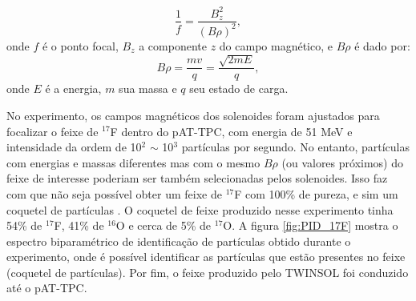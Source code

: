\documentclass[a4paper,12pt,oneside]{book}
\begin{document}
\begin{equation}
    \frac{1}{f} = \frac{B_z ^2}{(B\rho)^2},
\end{equation}
%
onde $f$ é o ponto focal, $B_z$ a componente $z$ do campo magnético, e $B\rho$ é dado por:
%
\begin{equation}
    B\rho = \frac{mv}{q} = \frac{\sqrt{2mE}}{q},
\end{equation}
%
onde $E$ é a energia, $m$ sua massa e $q$ seu estado de carga.


\par No experimento, os campos magnéticos dos solenoides foram ajustados para focalizar o feixe de $^{17}$F dentro do pAT-TPC, com energia de 51 MeV e intensidade da ordem de 10$^2$ $\sim$ 10$^3$ partículas por segundo. No entanto, partículas com energias e massas diferentes mas com o mesmo $B\rho$ (ou valores próximos) do feixe de interesse poderiam ser também selecionadas pelos solenoides. Isso faz com que não seja possível obter um feixe de $^{17}$F com 100\% de pureza, e sim um coquetel de partículas \cite{zamora_mater}. O coquetel de feixe produzido nesse experimento tinha 54\% de $^{17}$F, 41\% de $^{16}$O e cerca de 5\% de $^{17}$O. A figura \ref{fig:PID_17F} mostra o espectro biparamétrico de identificação de partículas obtido durante o experimento, onde é possível identificar as partículas que estão presentes no feixe (coquetel de partículas). Por fim, o feixe produzido pelo TWINSOL foi conduzido até o pAT-TPC.
\end{document}

